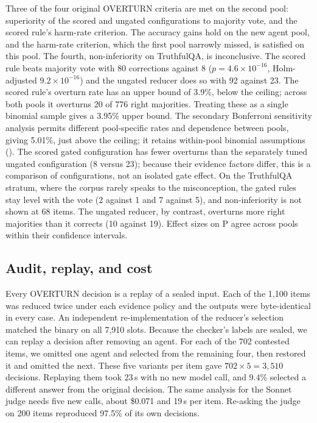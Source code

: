 Three of the four original OVERTURN criteria are met on the second pool: superiority of the scored and ungated configurations to majority vote, and the scored rule's harm-rate criterion. The accuracy gains hold on the new agent pool, and the harm-rate criterion, which the first pool narrowly missed, is satisfied on this pool. The fourth, non-inferiority on TruthfulQA, is inconclusive. The scored rule beats majority vote with 80 corrections against 8 ($p = 4.6 \times 10^{-16}$, Holm-adjusted $9.2 \times 10^{-16}$) and the ungated reducer does so with 92 against 23. The scored rule's overturn rate has an upper bound of 3.9\%, below the ceiling; across both pools it overturns 20 of 776 right majorities. Treating these as a single binomial sample gives a 3.95\% upper bound. The secondary Bonferroni sensitivity analysis permits different pool-specific rates and dependence between pools, giving 5.01\%, just above the ceiling; it retains within-pool binomial assumptions (). The scored gated configuration has fewer overturns than the separately tuned ungated configuration (8 versus 23); because their evidence factors differ, this is a comparison of configurations, not an isolated gate effect. On the TruthfulQA stratum, where the corpus rarely speaks to the misconception, the gated rules stay level with the vote (2 against 1 and 7 against 5), and non-inferiority is not shown at 68 items. The ungated reducer, by contrast, overturns more right majorities than it corrects (10 against 19). Effect sizes on P agree across pools within their confidence intervals.

\subsection{Audit, replay, and cost}
\label{sec:audit-results}

Every OVERTURN decision is a replay of a sealed input. Each of the 1,100 items was reduced twice under each evidence policy and the outputs were byte-identical in every case. An independent re-implementation of the reducer's selection matched the binary on all 7,910 slots. Because the checker's labels are sealed, we can replay a decision after removing an agent. For each of the 702 contested items, we omitted one agent and selected from the remaining four, then restored it and omitted the next. These five variants per item gave $702 \times 5 = 3{,}510$ decisions. Replaying them took 23\,s with no new model call, and 9.4\% selected a different answer from the original decision. The same analysis for the Sonnet judge needs five new calls, about \$0.071 and 19\,s per item. Re-asking the judge on 200 items reproduced 97.5\% of its own decisions.


